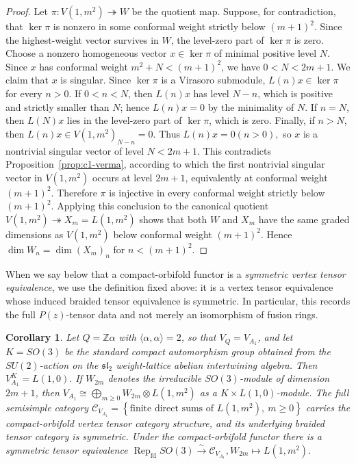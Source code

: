 \documentclass[12pt,leqno]{amsart}
\numberwithin{equation}{section} \newtheorem{thm}{Theorem}[section] \newtheorem{lem}[thm]{Lemma} \newtheorem{ex}[thm]{Example} \newtheorem{prop}[thm]{Proposition} \newtheorem{cor}[thm]{Corollary} \newtheorem{defi}[thm]{Definition} \newtheorem{rmk}[thm]{Remark} \newtheorem{notation}[thm]{Notation}
\newcommand{\Rep}{\operatorname{Rep}}
\def\Z{\mathbb{Z}} \def\N{\mathbb{N}} \def\A{\mathbb{A}} \def\C{\mathbb{C}} \def\R{\mathbb{R}} \def\Q{\mathbb{Q}} \def\F{\mathbb{F}}
\begin{document}
\begin{proof}
Let $ \pi:V(1,m^2)\twoheadrightarrow W $ be the quotient map. Suppose, for contradiction, that \(\ker\pi\) is nonzero in some conformal weight strictly below \((m+1)^2\). Since the highest-weight vector survives in \(W\), the level-zero part of \(\ker\pi\) is zero. Choose a nonzero homogeneous vector $ x\in\ker\pi $ of minimal positive level \(N\). Since \(x\) has conformal weight \(m^2+N<(m+1)^2\), we have $ 0<N<2m+1. $ We claim that \(x\) is singular. Since \(\ker\pi\) is a Virasoro submodule, \(L(n)x\in\ker\pi\) for every \(n>0\). If \(0<n<N\), then \(L(n)x\) has level \(N-n\), which is positive and strictly smaller than \(N\); hence \(L(n)x=0\) by the minimality of \(N\). If \(n=N\), then \(L(N)x\) lies in the level-zero part of \(\ker\pi\), which is zero. Finally, if \(n>N\), then $ L(n)x\in V(1,m^2)_{N-n}=0. $ Thus $L(n)x=0(n>0),$ so \(x\) is a nontrivial singular vector of level \(N<2m+1\). This contradicts Proposition~\ref{prop:c1-verma}, according to which the first nontrivial singular vector in \(V(1,m^2)\) occurs at level \(2m+1\), equivalently at conformal weight $ (m+1)^2. $ Therefore \(\pi\) is injective in every conformal weight strictly below \((m+1)^2\). Applying this conclusion to the canonical quotient $ V(1,m^2)\twoheadrightarrow X_m=L(1,m^2) $ shows that both \(W\) and \(X_m\) have the same graded dimensions as \(V(1,m^2)\) below conformal weight \((m+1)^2\). Hence $ \dim W_n=\dim (X_m)_n$ for $n<(m+1)^2. $
\end{proof}

When we say below that a compact-orbifold functor is a \emph{symmetric vertex tensor equivalence}, we use the definition fixed above: it is a vertex tensor equivalence whose induced braided tensor equivalence is symmetric. In particular, this records the full $P(z)$-tensor data and not merely an isomorphism of fusion rings.

\begin{cor}
\label{cor:McRae-A1-SO3}
Let \(Q=\Z\alpha\) with \(\langle\alpha,\alpha\rangle=2\), so that \(V_Q=V_{A_1}\), and let \(K=SO(3)\) be the standard compact automorphism group obtained from the \(SU(2)\)-action on the \(\mathfrak{sl}_2\) weight-lattice abelian intertwining algebra. Then \(V_{A_1}^{K}=L(1,0).\) If \(W_{2m}\) denotes the irreducible \(SO(3)\)-module of dimension \(2m+1\), then \(V_{A_1}\cong\bigoplus_{m\ge0}W_{2m}\otimes L(1,m^2)\) as a \(K\times L(1,0)\)-module. The full semisimple category \(\mathcal C_{V_{A_1}}=\left\{\text{finite direct sums of }L(1,m^2),\ m\ge0\right\}\) carries the compact-orbifold vertex tensor category structure, and its underlying braided tensor category is symmetric. Under the compact-orbifold functor there is a symmetric tensor equivalence \(\Rep_{\mathrm{fd}}SO(3) \overset{\sim}{\longrightarrow} \mathcal C_{V_{A_1}}, W_{2m}\longmapsto L(1,m^2)\).
\end{cor}
\end{document}
